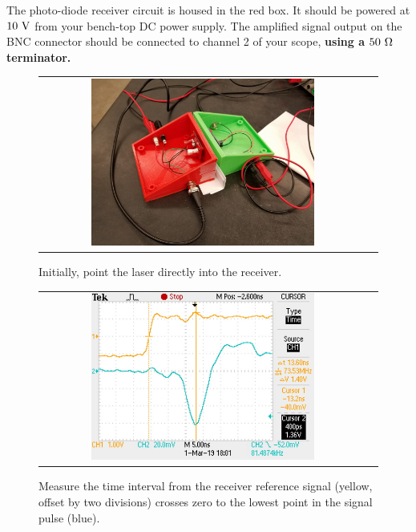 The photo-diode receiver circuit is housed in the red box.  It should
be powered at $10~\rm V$ from your bench-top DC power supply.  The
amplified signal output on the BNC connector should be connected to
channel 2 of your scope, {\bf using a $50~\rm \Omega$ terminator.}


\begin{figure}[htbp]
\begin{center}
\begin{tabular}{cc}
\includegraphics[width=0.7\textwidth]{figs/labs/c_air/tzero.jpg}
\end{tabular}
\end{center}
\caption{\label{fig:ctzero} Initially, point the laser directly into the receiver.}
\end{figure}

\begin{figure}[htbp]
\begin{center}
\begin{tabular}{cc}
\includegraphics[width=0.7\textwidth]{figs/labs/c_air/time_peak.jpg}
\end{tabular}
\end{center}
\caption{\label{fig:ctime} Measure the time interval from the receiver reference signal (yellow, offset by two divisions) crosses zero to the lowest point in the signal pulse (blue).}
\end{figure}

